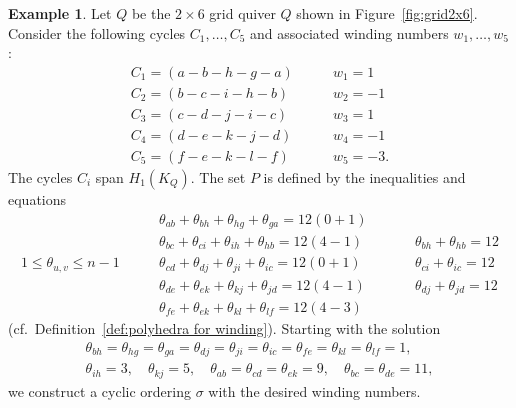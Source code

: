 \documentclass[11pt, letterpaper]{amsart}
\theoremstyle{definition}
\newtheorem{example}[theorem]{Example}
\numberwithin{equation}{section}
\def\wind{{\operatorname{wind}}}
\begin{document}
\begin{example}
\label{eg:grid2x6}
Let $Q$ be the $2 \times 6$ grid quiver $Q$ shown in Figure~\ref{fig:grid2x6}.
Consider the following cycles $C_1,\dots,C_5$ and associated winding numbers $w_1,\dots,w_5$: 
\begin{equation*}
\begin{array}{ll} 
C_1 = ( a - b -  h - g-a) \qquad & w_1=1 \\[2pt]
C_2 = (b - c - i - h-b) & w_2=-1 \\[2pt]
C_3 = (c - d - j - i - c) & w_3= 1 \\[2pt]
C_4 = (d - e - k - j - d) & w_4=-1 \\[2pt]
C_5 = (f - e - k - l - f) & w_5=-3. 
\end{array}
\end{equation*}
The cycles $C_i$ span $H_1(K_Q)$. 
The set $P$ is defined by the inequalities %
and equations 
\begin{equation*}
\begin{array}{lll}
& \theta_{ab} + \theta_{bh} + \theta_{hg} + \theta_{ga} = 12(0+1) \\[2pt]
& \theta_{bc} + \theta_{ci} + \theta_{ih} + \theta_{hb} = 12(4-1) &  \theta_{bh} +\theta_{hb} = 12 \\[2pt]
1 \leq \theta_{u,v} \leq n-1\qquad
& \theta_{cd} + \theta_{dj} + \theta_{ji} + \theta_{ic} = 12(0+1) \quad\qquad & \theta_{ci} +\theta_{ic} = 12  \\[2pt]
& \theta_{de} + \theta_{ek} + \theta_{kj} + \theta_{jd} = 12(4-1) & \theta_{dj} +\theta_{jd} = 12\\[2pt]
& \theta_{fe} + \theta_{ek} + \theta_{kl} + \theta_{lf} = 12(4-3)
\end{array}
\end{equation*}
(cf.\ Definition~\ref{def:polyhedra for winding}). 
Starting with the solution 
\begin{equation*}
\begin{array}{c}
\theta_{bh} = \theta_{hg} = \theta_{ga}= \theta_{dj}= \theta_{ji}= \theta_{ic}= \theta_{fe} = \theta_{kl} = \theta_{lf} =1, \\[4pt]
\theta_{ih} = 3, \quad \theta_{kj} = 5, \quad \theta_{ab} = \theta_{cd} = \theta_{ek} = 9, \quad \theta_{bc} = \theta_{de} = 11,
\end{array}
\end{equation*}
we construct a cyclic ordering $\sigma$ with the desired winding numbers. %

\end{example}
\end{document}

